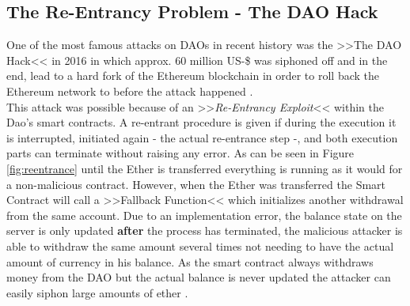 \documentclass[a4paper,12pt]{report}
\begin{document}
	    \subsection{The Re-Entrancy Problem - The DAO Hack}
	    \startsubsection
	        One of the most famous attacks on DAOs in recent history was the >>The DAO Hack<< in 2016 in which approx. 60 million US-\$ was siphoned off and in the end, lead to a hard fork of the Ethereum blockchain in order to roll back the Ethereum network to before the attack happened \parencite{theDAOAttack}. \\
	        This attack was possible because of an >>\textit{Re-Entrancy Exploit}<< within the Dao's smart contracts. A re-entrant procedure is given if during the execution it is interrupted, initiated again - the actual re-entrance step -, and both execution parts can terminate without raising any error. As can be seen in Figure \ref{fig:reentrance} until the Ether is transferred everything is running as it would for a non-malicious contract. However, when the Ether was transferred the Smart Contract will call a >>Fallback Function<< which initializes another withdrawal from the same account. Due to an implementation error, the balance state on the server is only updated \textbf{after} the process has terminated, the malicious attacker is able to withdraw the same amount several times not needing to have the actual amount of currency in his balance. As the smart contract always withdraws money from the DAO but the actual balance is never updated the attacker can easily siphon large amounts of ether \parencite{ReentrancyAttack}.
\end{document}

